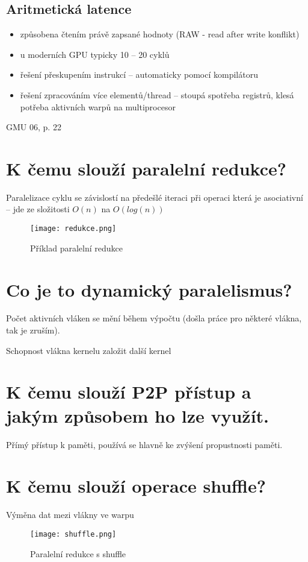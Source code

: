 	\subsection*{Aritmetická latence}
	\begin{itemize}
		\setlength\itemsep{0em}
		\item způsobena čtením právě zapsané hodnoty (RAW - read after write konflikt)
		\item u moderních GPU typicky 10 -- 20 cyklů
		\item řešení přeskupením instrukcí -- automaticky pomocí kompilátoru
		\item řešení zpracováním více elementů/thread -- stoupá spotřeba registrů, klesá potřeba aktivních warpů na multiprocesor
	\end{itemize}


	GMU 06, p. 22
	

\section{K čemu slouží paralelní redukce?}
	Paralelizace cyklu se závislostí na předešlé iteraci při operaci která je asociativní -- jde ze složitosti $O(n)$ na $O(log(n))$
	\begin{figure}[h]
		\centering
		\texttt{[image: redukce.png]}
		\caption{Příklad paralelní redukce}
		\label{fig:redukce}
	\end{figure}


\section{Co je to dynamický paralelismus?}
	Počet aktivních vláken se mění během výpočtu (došla práce pro některé vlákna, tak je zruším).
	
	Schopnost vlákna kernelu založit další kernel
	



\section{K čemu slouží P2P přístup a jakým způsobem ho lze využít.}
	Přímý přístup k paměti, používá se hlavně ke zvýšení propustnosti paměti.
	

\section{K čemu slouží operace shuffle?}
	Výměna dat mezi vlákny ve warpu
	\begin{figure}[h]
		\centering
		\texttt{[image: shuffle.png]}
		\caption{Paralelní redukce s shuffle}
		\label{fig:shuffle}
	\end{figure}


